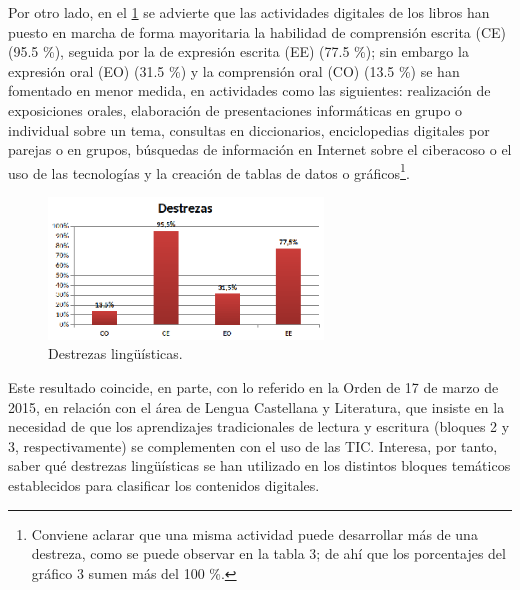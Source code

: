 \documentclass[spanish]{textolivre}
\begin{document}
Por otro lado, en el \cref{Fig03} se advierte que las actividades digitales de los libros han puesto en marcha de forma mayoritaria la habilidad de comprensión escrita (CE) (95.5 \%), seguida por la de expresión escrita (EE) (77.5 \%); sin embargo la expresión oral (EO) (31.5 \%) y la comprensión oral (CO) (13.5 \%) se han fomentado en menor medida, en actividades como las siguientes: realización de exposiciones orales, elaboración de presentaciones informáticas en grupo o individual sobre un tema, consultas en diccionarios, enciclopedias digitales por parejas o en grupos, búsquedas de información en Internet sobre el ciberacoso o el uso de las tecnologías y la creación de tablas de datos o gráficos\footnote{Conviene aclarar que una misma actividad puede desarrollar más de una destreza, como se puede observar en la tabla 3; de ahí que los porcentajes del gráfico 3 sumen más del 100 \%.}. 

\begin{figure}[htbp]
 \centering
 \includegraphics[width=0.65\textwidth]{Fig03.eps}
 \caption{Destrezas lingüísticas.}
 \label{Fig03}
\end{figure}

Este resultado coincide, en parte, con lo referido en la Orden de 17 de marzo de 2015, en relación con el área de Lengua Castellana y Literatura, que insiste en la necesidad de que los aprendizajes tradicionales de lectura y escritura (bloques 2 y 3, respectivamente) se complementen con el uso de las TIC. Interesa, por tanto, saber qué destrezas lingüísticas se han utilizado en los distintos bloques temáticos establecidos para clasificar los contenidos digitales. 
\end{document}
